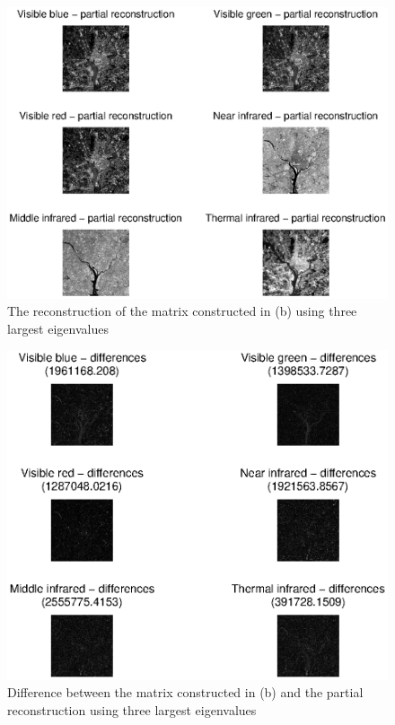 \begin{figure}[htb]
 \centering
 \includegraphics[width=\linewidth]{partial_recon_pca.eps}
 \caption{The reconstruction of the matrix constructed in (b) using three largest eigenvalues}
 \label{fig:partial_recon_pca}
\end{figure}

\begin{figure}[htb]
 \centering
 \includegraphics[width=\linewidth]{differences_pca.eps}
 \caption{Difference between the matrix constructed in (b) and the partial reconstruction using three largest eigenvalues}
 \label{fig:differences_pca}
\end{figure}
\clearpage
